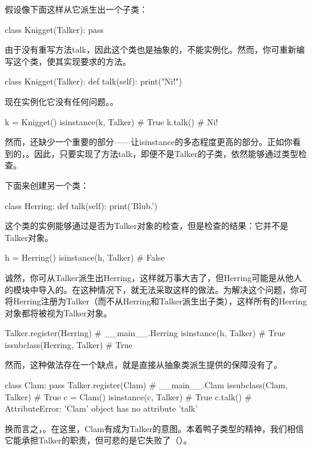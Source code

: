 假设像下面这样从它派生出一个子类：
\begin{pyc}
class Knigget(Talker):
    pass
\end{pyc}
由于没有重写方法talk，因此这个类也是抽象的，不能实例化。然而，你可重新编写这个类，使其实现要求的方法。
\begin{pyc}
class Knigget(Talker):
    def talk(self):
        print("Ni!")
\end{pyc}

现在实例化它没有任何问题。。

\begin{pyc}
k = Knigget()
isinstance(k, Talker)  # True
k.talk()  # Ni!
\end{pyc}

然而，还缺少一个重要的部分——让isinstance的多态程度更高的部分。正如你看到的，。因此，只要实现了方法talk，即便不是Talker的子类，依然能够通过类型检查。

下面来创建另一个类：
\begin{pyc}
class Herring:
    def talk(self):
        print('Blub.') 
\end{pyc}

这个类的实例能够通过是否为Talker对象的检查，但是检查的结果：它并不是Talker对象。
\begin{pyc}
h = Herring()
isinstance(h, Talker)  # False
\end{pyc}

诚然，你可从Talker派生出Herring，这样就万事大吉了，但Herring可能是从他人的模块中导入的。在这种情况下，就无法采取这样的做法。为解决这个问题，你可将Herring注册为Talker（而不从Herring和Talker派生出子类），这样所有的Herring对象都将被视为Talker对象。
\begin{pyc}
Talker.register(Herring)  # __main__.Herring
isinstance(h, Talker)  # True
issubclass(Herring, Talker)  # True
\end{pyc}

然而，这种做法存在一个缺点，就是直接从抽象类派生提供的保障没有了。
\begin{pyc}
class Clam:
    pass
Talker.register(Clam)  # __main__.Clam
issubclass(Clam, Talker)  # True
c = Clam()
isinstance(c, Talker)  # True
c.talk()  # AttributeError: 'Clam' object has no attribute 'talk'
\end{pyc}
换而言之，。在这里，Clam有成为Talker的意图。本着鸭子类型的精神，我们相信它能承担Talker的职责，但可悲的是它失败了（）。

